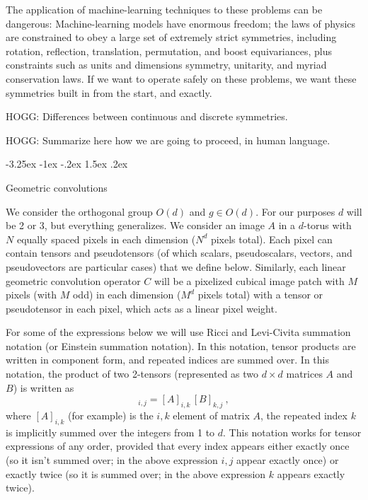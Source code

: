 \documentclass{article}
\makeatletter
\theoremstyle{plain}
\renewcommand\section{\@startsection {section}{1}{\z@}%
  {-3.25ex \@plus -1ex \@minus -.2ex}%
  {1.5ex \@plus .2ex}%
  {\raggedright\normalfont\large\bfseries}}
\makeatother
\begin{document}
The application of machine-learning techniques to these problems can be dangerous:
Machine-learning models have enormous freedom; the laws of physics are constrained to obey a large set of extremely strict symmetries, including rotation, reflection, translation, permutation, and boost equivariances, plus constraints such as units and dimensions symmetry, unitarity, and myriad conservation laws.
If we want to operate safely on these problems, we want these symmetries built in from the start, and exactly.

HOGG: Differences between continuous and discrete symmetries.

HOGG: Summarize here how we are going to proceed, in human language.


\section{Geometric convolutions}\label{sec:convolution}

We consider the orthogonal group $O(d)$ and $g\in O(d)$. For our purposes $d$ will be 2 or 3, but everything generalizes.  
We consider an image $A$ in a $d$-torus with $N$ equally spaced pixels in each dimension ($N^d$ pixels total). Each pixel can contain tensors and pseudotensors (of which scalars, pseudoscalars, vectors, and pseudovectors are particular cases) that we define below.
Similarly, each linear geometric convolution operator $C$ will be a pixelized cubical image patch with $M$ pixels (with $M$ odd) in each dimension ($M^d$ pixels total) with a tensor or pseudotensor in each pixel, which acts as a linear pixel weight.

For some of the expressions below we will use Ricci and Levi-Civita summation notation (or Einstein summation notation).
In this notation, tensor products are written in component form, and repeated indices are summed over.
In this notation, the product of two 2-tensors (represented as two $d\times d$ matrices $A$ and $B$) is written as
\begin{equation}
    [A\, B]_{i,j} = [A]_{i,k}\,[B]_{k,j} ~,
\end{equation}
where $[A]_{i,k}$ (for example) is the $i,k$ element of matrix $A$, the repeated index $k$ is implicitly summed over the integers from 1 to $d$.
This notation works for tensor expressions of any order, provided that every index appears either exactly once (so it isn't summed over; in the above expression $i, j$ appear exactly once) or exactly twice (so it is summed over; in the above expression $k$ appears exactly twice). 
\end{document}

